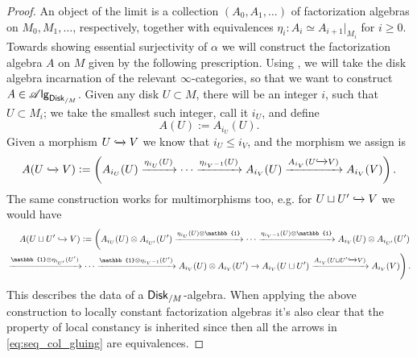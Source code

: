 \documentclass[../text]{subfiles}
\begin{document}
\begin{proof}
    An object of the limit is a collection $(A_0, A_1, \dots)$ of factorization algebras on $M_0, M_1, \dots$, respectively, together with equivalences $\eta_i: A_i \simeq A_{i+1}|_{M_i}$ for $i \geq 0$. Towards showing essential surjectivity of $\alpha$ we will construct the factorization algebra $A$ on $M$ given by the following prescription. Using , we will take the disk algebra incarnation of the relevant $\infty$-categories, so that we want to construct $A \in \alg{\disk[r]_{/M}}$. Given any disk $U \subset M$, there will be an integer $i$, such that $U \subset M_i$; we take the smallest such integer, call it $i_U$, and define
    \begin{equation}
        A(U) := A_{i_U} (U).
    \end{equation}
    Given a morphism $U \xhookrightarrow{} V$ we know that $i_U \leq i_V$, and the morphism we assign is
    \begin{equation}\label{eq:seq_col_gluing}
        A(U \xhookrightarrow{} V) := \left( A_{i_U}(U) \xrightarrow{\eta_{i_U}(U)} \cdots \xrightarrow{\eta_{i_V - 1}(U)} A_{i_V} (U) \xrightarrow{A_{i_V} (U \xhookrightarrow{} V)} A_{i_V} (V) \right).
    \end{equation}
    The same construction works for multimorphisms too, e.g. for $U \sqcup U' \xhookrightarrow{} V$ we would have
    \begin{align}
        A(U \sqcup U' \xhookrightarrow{} V) := \left( A_{i_U}(U) \otimes A_{i_{U'}} (U') \xrightarrow{\eta_{i_U}(U) \otimes \mathbb{1}} \cdots \xrightarrow{\eta_{i_V - 1}(U) \otimes \mathbb{1}} A_{i_V} (U) \otimes A_{i_{U'}}(U') \right. \notag\\
        \left.\xrightarrow{\mathbb{1} \otimes \eta_{i_{U'}}(U')} \cdots \xrightarrow{\mathbb{1} \otimes \eta_{i_V - 1}(U')} A_{i_V} (U) \otimes A_{i_V} (U') \xrightarrow{} A_{i_V} (U \sqcup U') \xrightarrow{A_{i_V} (U \sqcup U' \xhookrightarrow{} V)} A_{i_V} (V) \right).
    \end{align} 
    This describes the data of a $\disk[r]_{/M}$-algebra. When applying the above construction to locally constant factorization algebras it's also clear that the property of local constancy is inherited since then all the arrows in \cref{eq:seq_col_gluing} are equivalences.
    

\end{proof}
\end{document}
